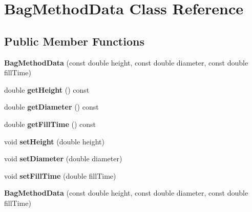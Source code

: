 \hypertarget{class_bag_method_data}{}\section{Bag\+Method\+Data Class Reference}
\label{class_bag_method_data}
\subsection*{Public Member Functions}
\begin{DoxyCompactItemize}
\item 
\mbox{\label{class_bag_method_data_a16de9ec7fc35125ba4bac79dce2e30f3}} 
{\bfseries Bag\+Method\+Data} (const double height, const double diameter, const double fill\+Time)
\item 
\mbox{\label{class_bag_method_data_a1f9c6daa18893692a1203651026c874f}} 
double {\bfseries get\+Height} () const
\item 
\mbox{\label{class_bag_method_data_aac268101eef38828aebdecff0a722fcd}} 
double {\bfseries get\+Diameter} () const
\item 
\mbox{\label{class_bag_method_data_afc8aeaca62ae2a1f3dc7a1651d680d8b}} 
double {\bfseries get\+Fill\+Time} () const
\item 
\mbox{\label{class_bag_method_data_a7ef196332edce80bc4a0e33e09948f6a}} 
void {\bfseries set\+Height} (double height)
\item 
\mbox{\label{class_bag_method_data_aba2d319b9fe44f4ebea5cb01014b5f97}} 
void {\bfseries set\+Diameter} (double diameter)
\item 
\mbox{\label{class_bag_method_data_a43ff2b841656dd33bb358dd79ca3cd80}} 
void {\bfseries set\+Fill\+Time} (double fill\+Time)
\item 
\mbox{\label{class_bag_method_data_a16de9ec7fc35125ba4bac79dce2e30f3}} 
{\bfseries Bag\+Method\+Data} (const double height, const double diameter, const double fill\+Time)
\item 

\end{DoxyCompactItemize}
